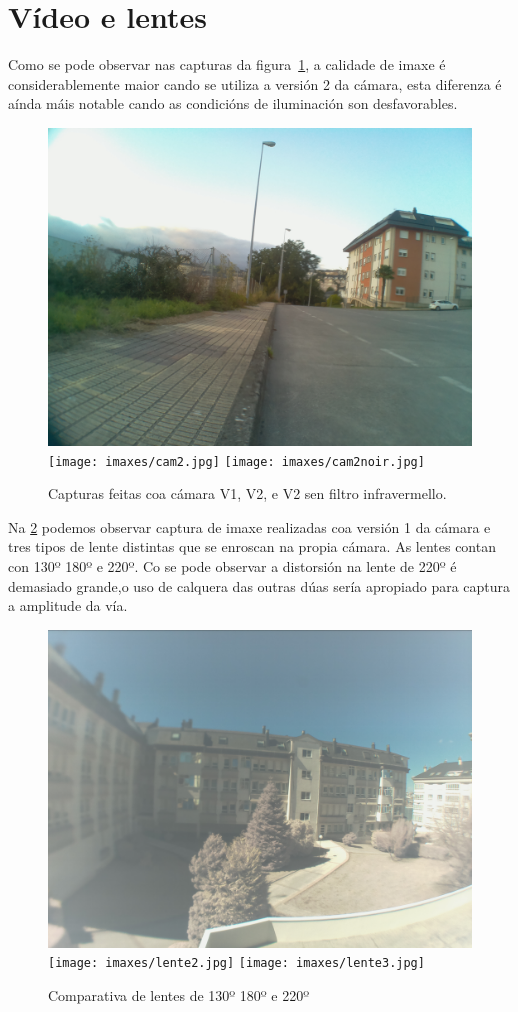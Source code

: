 \section{Vídeo e lentes}
Como se pode observar nas capturas da figura~\ref{fig:compcam}, a calidade de imaxe é considerablemente maior cando se utiliza a versión 2 da cámara, esta diferenza é aínda máis notable cando as condicións de iluminación son desfavorables.
\begin{figure}[tbp]
  \centering
  \includegraphics[scale=0.05]{imaxes/cam1.jpg}
  \texttt{[image: imaxes/cam2.jpg]}
  \texttt{[image: imaxes/cam2noir.jpg]}
  \caption{Capturas feitas coa cámara V1, V2, e V2 sen filtro infravermello.}
  \label{fig:compcam}
\end{figure}
Na \ref{fig:complen} podemos observar captura de imaxe realizadas coa versión 1 da cámara e tres tipos de lente distintas que se enroscan na propia cámara. As lentes contan con 130º 180º e 220º. Co se pode observar a distorsión na lente de 220º é demasiado grande,o uso de calquera das outras dúas sería apropiado para captura a amplitude da vía.

\begin{figure}[tbp]
  \centering
  \includegraphics[scale=0.05]{imaxes/lente1.jpg}
  \texttt{[image: imaxes/lente2.jpg]}
  \texttt{[image: imaxes/lente3.jpg]}
  \caption{Comparativa de lentes de 130º 180º e 220º}
  \label{fig:complen}
\end{figure}

